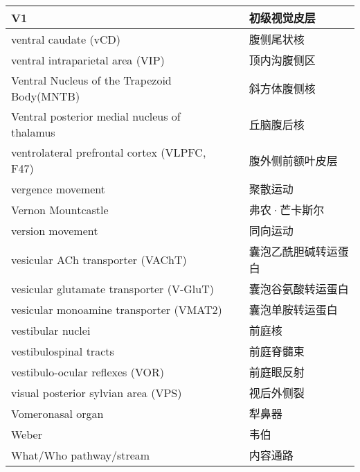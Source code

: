 \begin{longtable}{lll}
	\midrule
	V1   && 初级视觉皮层  \\
	
	\midrule
	ventral caudate (vCD)   && 腹侧尾状核  \\
	
	\midrule
	ventral intraparietal area (VIP)   && 顶内沟腹侧区  \\
	
	\midrule
	Ventral Nucleus of the Trapezoid Body(MNTB)   && 斜方体腹侧核  \\
	
	\midrule
	Ventral posterior medial nucleus of thalamus   && 丘脑腹后核  \\
	
	\midrule
	ventrolateral prefrontal cortex (VLPFC, F47)   && 腹外侧前额叶皮层  \\
	
	\midrule
	vergence movement   && 聚散运动  \\
	
	\midrule
	Vernon Mountcastle   && 弗农·芒卡斯尔  \\
	
	\midrule
	version movement   && 同向运动  \\
	
	\midrule
	vesicular ACh transporter (VAChT)   && 囊泡乙酰胆碱转运蛋白  \\
	
	\midrule
	vesicular glutamate transporter (V-GluT)   && 囊泡谷氨酸转运蛋白  \\
	
	\midrule
	vesicular monoamine transporter (VMAT2)   && 囊泡单胺转运蛋白  \\
	
	\midrule
	vestibular nuclei   && 前庭核  \\
	
	\midrule
	vestibulospinal tracts   && 前庭脊髓束  \\
	
	\midrule
	vestibulo-ocular reflexes (VOR)   && 前庭眼反射  \\
	
	\midrule
	visual posterior sylvian area (VPS)   && 视后外侧裂  \\
	
	\midrule
	Vomeronasal organ   && 犁鼻器  \\
	
	\midrule
	Weber  && 韦伯  \\
	
	\midrule
	What/Who pathway/stream  && 内容通路  \\
	

\end{longtable}
